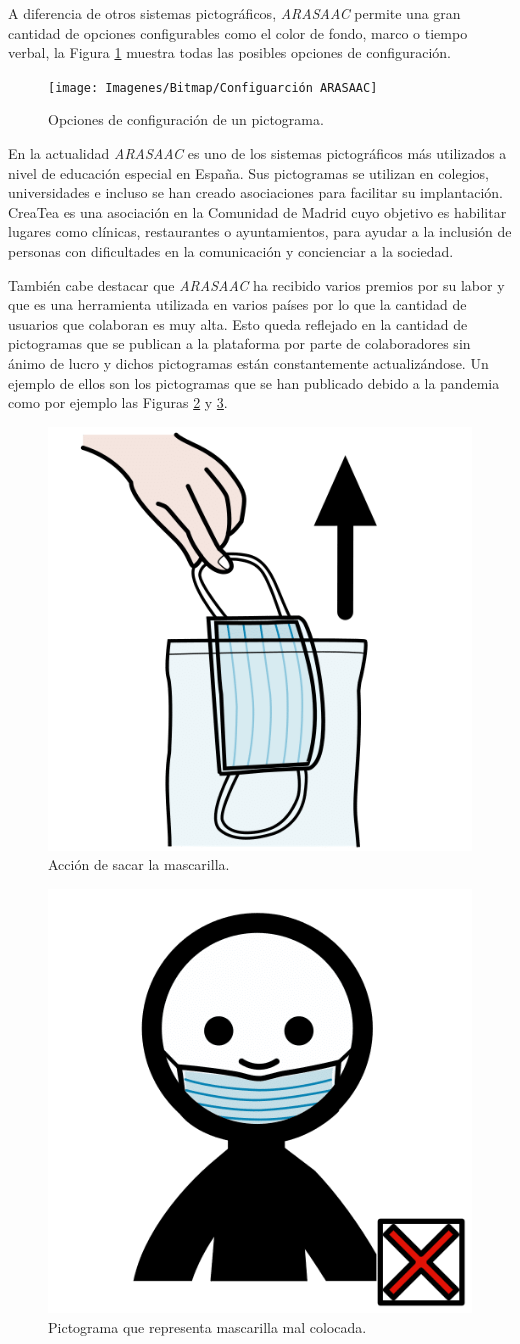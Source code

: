 A diferencia de otros sistemas pictográficos, \textit{ARASAAC} permite una gran cantidad de opciones configurables como el color de fondo, marco o tiempo verbal, la Figura \ref{fig:configuarcion-arasaac} muestra todas las posibles opciones de configuración.



\begin{figure}[h!]
	\centering
	\texttt{[image: Imagenes/Bitmap/Configuarción ARASAAC]}
	\caption{Opciones de configuración de un pictograma.}
	\label{fig:configuarcion-arasaac}
\end{figure}



En la actualidad \textit{ARASAAC} es uno de los sistemas pictográficos más utilizados a nivel de educación especial en España. Sus pictogramas se utilizan en colegios, universidades e incluso se han creado asociaciones para facilitar su implantación. CreaTea es una asociación en la Comunidad de Madrid cuyo objetivo es habilitar lugares como clínicas, restaurantes o ayuntamientos, para ayudar a la inclusión de personas con dificultades en la comunicación y concienciar a la sociedad.

También cabe destacar que \textit{ARASAAC} ha recibido varios premios por su labor y que es una herramienta utilizada en varios países por lo que la cantidad de usuarios que colaboran es muy alta. Esto queda reflejado en la cantidad de pictogramas que se publican a la plataforma por parte de colaboradores sin ánimo de lucro y dichos pictogramas están constantemente actualizándose. Un ejemplo de ellos son los pictogramas que se han publicado debido a la pandemia como por ejemplo las Figuras \ref{fig:picto-mascarilla} y \ref{fig:picto-mascarilla-mal-colocada}.


\begin{figure}[h!]
	\centering
	\includegraphics[width=0.2\linewidth]{Imagenes/Bitmap/Picto Mascarilla}
	\caption{Acción de sacar la mascarilla.}
	\label{fig:picto-mascarilla}
\end{figure}

\begin{figure}[h!]
	\centering
	\includegraphics[width=0.2\linewidth]{Imagenes/Bitmap/Mascarilla mal colocada}
	\caption{Pictograma que representa mascarilla mal colocada.}
	\label{fig:picto-mascarilla-mal-colocada}
\end{figure}

